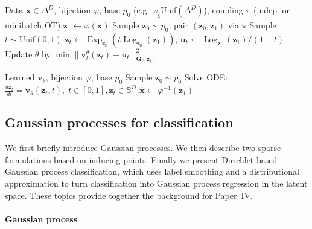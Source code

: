 \begin{algorithm}
\caption{Training of SFM.}
\label{alg:train_sfm}
\begin{algorithmic}[1]
\Require Data $\boldsymbol{x}\!\in\!\Delta^{D}$, bijection $\varphi$, base $p_0$ (e.g. $\varphi_\sharp \mathrm{Unif}(\Delta^D)$), 
coupling $\pi$ (indep. or minibatch OT)
  \State $\boldsymbol{z}_1 \gets \varphi({\boldsymbol{x}})$ 
  \State Sample $\boldsymbol{z}_0 \sim p_0$; pair $(\boldsymbol{z}_0,\boldsymbol{z}_1)$ via $\pi$
  \State Sample $t\sim \mathrm{Unif}(0,1)$
  \State $\boldsymbol{z}_t\!\gets\!\operatorname{Exp}_{\boldsymbol{z}_0}( t \operatorname{Log}_{\boldsymbol{z}_0}(\boldsymbol{z}_1))$, \;
         $\boldsymbol{u}_t\!\gets\!{\operatorname{Log}_{\boldsymbol{z}_t}(\boldsymbol{z}_1)}/({1-t})$
  \State Update $\theta$ by 
  $\min \|\boldsymbol{v}_t^\theta(\boldsymbol{z}_t)-\boldsymbol{u}_t\|_{\mathbf{G}(\boldsymbol{z}_t)}^2$ \; 
\EndFor
\end{algorithmic}
\end{algorithm}

\begin{algorithm}[t]
\caption{Sampling with SFM.}
\label{alg:sample_sfm}
\begin{algorithmic}[1]
\Require Learned $\boldsymbol{v}_\theta$, bijection $\varphi$, base $p_0$
\State Sample $\boldsymbol{z}_0 \sim p_0$ 
\State Solve ODE: 
$\tfrac{d\boldsymbol{z}_t}{dt} = \boldsymbol{v}_\theta(\boldsymbol{z}_t,t), \; t\!\in[0,1], \boldsymbol{z}_t\in \mathbb{S}^D$
\State $\hat{\boldsymbol{x}} \gets \varphi^{-1}(\boldsymbol{z}_1)$
\end{algorithmic}
\end{algorithm}

\subsection{Gaussian processes for classification} \label{sec:gp}

We first briefly introduce Gaussian processes.  We then describe two sparse formulations based on inducing points. Finally we present Dirichlet-based Gaussian process classification, which uses label smoothing and a distributional approximation to turn classification into Gaussian process regression in the latent space. These topics provide together the background for Paper~IV.

\paragraph{Gaussian process}

